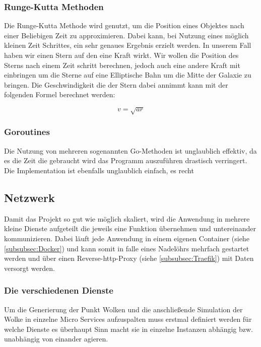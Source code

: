 \subsubsection{Runge-Kutta Methoden}
Die Runge-Kutta Methode wird genutzt, um die Position eines Objektes nach einer
Beliebigen Zeit zu approximieren. Dabei kann, bei Nutzung eines möglich kleinen
Zeit Schrittes, ein sehr genaues Ergebnis erzielt werden.  In unserem Fall
haben wir einen Stern auf den eine Kraft wirkt. Wir wollen die Position des
Sterns nach einem Zeit schritt berechnen, jedoch auch eine andere Kraft mit
einbringen um die Sterne auf eine Elliptische Bahn um die Mitte der Galaxie zu
bringen.  Die Geschwindigkeit die der Stern dabei annimmt kann mit der
folgenden Formel berechnet werden:

\begin{equation}
    v = \sqrt{ar}
\end{equation}

\subsubsection{Goroutines}
Die Nutzung von mehreren sogenannten Go-Methoden ist unglaublich effektiv, da
es die Zeit die gebraucht wird das Programm auszuführen drastisch verringert.
Die Implementation ist ebenfalls unglaublich einfach, es recht

\subsection{Netzwerk}

Damit das Projekt so gut wie möglich skaliert, wird die Anwendung in mehrere
kleine Dienste aufgeteilt die jeweils eine Funktion übernehmen und
untereinander kommunizieren. Dabei läuft jede Anwendung in einem eigenen
Container (siehe \ref{subsubsec:Docker}) und kann somit in falle eines
Nadelöhrs mehrfach gestartet werden und über einen Reverse-http-Proxy (siehe
\ref{subsubsec:Traefik}) mit Daten versorgt werden.

\subsubsection{Die verschiedenen Dienste}
Um die Generierung der Punkt Wolken und die anschließende Simulation der Wolke
in einzelne Micro Services aufzuspalten muss erstmal definiert werden für welche
Dienste es überhaupt Sinn macht sie in einzelne Instanzen abhängig bzw.
unabhängig von einander agieren.

